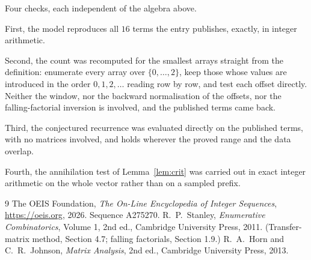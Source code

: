 \documentclass[11pt,a4paper]{article}
\theoremstyle{plain}
\theoremstyle{definition}
\begin{document}
Four checks, each independent of the algebra above.

First, the model reproduces all $16$ terms the entry publishes, exactly, in integer
arithmetic.

Second, the count was recomputed for the smallest arrays straight from the definition:
enumerate every array over $\{0,\dots,2\}$, keep those whose values are introduced in the
order $0,1,2,\dots$ reading row by row, and test each offset directly. Neither the window, nor
the backward normalisation of the offsets, nor the falling-factorial inversion is involved, and
the published terms came back.

Third, the conjectured recurrence was evaluated directly on the published terms, with no
matrices involved, and holds wherever the proved range and the data overlap.

Fourth, the annihilation test of Lemma~\ref{lem:crit} was carried out in exact integer
arithmetic on the whole vector rather than on a sampled prefix.

\begin{thebibliography}{9}
 The OEIS Foundation, \emph{The On-Line Encyclopedia of Integer
Sequences}, \url{https://oeis.org}, 2026. Sequence A275270.
 R.~P.~Stanley, \emph{Enumerative Combinatorics}, Volume 1, 2nd ed.,
Cambridge University Press, 2011. (Transfer-matrix method, Section 4.7; falling factorials,
Section 1.9.)
 R.~A.~Horn and C.~R.~Johnson, \emph{Matrix Analysis}, 2nd ed., Cambridge
University Press, 2013.
\end{thebibliography}
\end{document}
